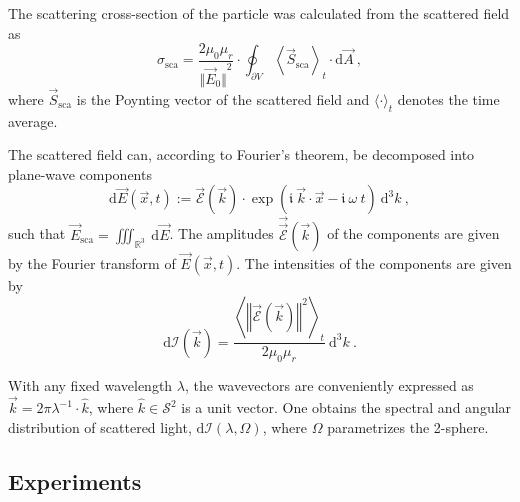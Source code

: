 \documentclass[10pt]{article}
\begin{document}
\begin{multicols}{2}
The scattering cross-section of the particle was calculated from the scattered field as 
$$
    \sigma_\mathrm{sca} = \frac{2 \mu_0 \mu_r}{ {\bigl\Vert \vec{E}_0 \bigr\Vert}^2 } \cdot \oint_{\partial V} {\left\langle \vec{S}_\mathrm{sca} \right\rangle}_t \cdot\mathrm{d}\vec{A} \ ,
$$
where $\vec{S}_\mathrm{sca}$ is the Poynting vector of the scattered field and $\langle\cdot\rangle_t$ denotes the time average. 

The scattered field can, according to Fourier's theorem, be decomposed into plane-wave components
$$
    \mathrm{d}\vec{E}(\vec{x},t) := \vec{\mathcal{E}}(\vec{k}) 
    \cdot 
    \exp{\!\left(\mathfrak{i}\ \vec{k}\cdot\vec{x} - \mathfrak{i}\ \omega\ t \right)}
    \ \mathrm{d}^3 k
    \ , 
$$
such that $ \vec{E}_\mathrm{sca} = \iiint_{\mathds{R}^3}\ \mathrm{d}\vec{E}$. 
The amplitudes $\vec{\vec{\mathcal{E}}}(\vec{k})$ of the components are given by the Fourier transform of $\vec{E}(\vec{x},t)$. 
The intensities of the components are given by 
$$
    \mathrm{d}\mathcal{I}(\vec{k}) = \frac{ {\left\langle {\left\Vert \vec{\mathcal{E}}(\vec{k}) \right\Vert}^2 \right\rangle}_t }{ 2\mu_0 \mu_r } \ \mathrm{d}^3k
    \ .
$$

With any fixed wavelength $\lambda$, the wavevectors are conveniently expressed as $ \vec{k} = 2 \pi \lambda^{-1} \cdot \hat{k} $, where \mbox{$\hat{k} \in \mathcal{S}^2$} is a unit vector. 
One obtains the spectral and angular distribution of scattered light, $\mathrm{d}\mathcal{I}(\lambda, \Omega)$, where $\Omega$ parametrizes the 2-sphere. 








\subsection*{Experiments}


\end{multicols}
\end{document}
